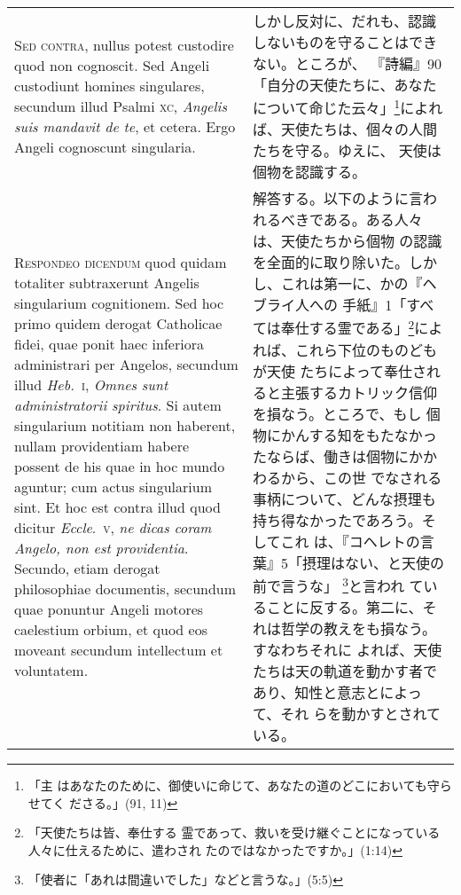 \documentclass[10pt]{jsarticle} %
\begin{document}
\begin{longtable}{p{21em}p{21em}}
\\


{\scshape Sed contra}, nullus potest custodire quod non cognoscit. Sed
Angeli custodiunt homines singulares, secundum illud Psalmi {\scshape
xc}, {\itshape Angelis suis mandavit de te}, et cetera. Ergo Angeli
cognoscunt singularia.


&


しかし反対に、だれも、認識しないものを守ることはできない。ところが、
『詩編』90「自分の天使たちに、あなたについて命じた云々」\footnote{「主
はあなたのために、御使いに命じて、あなたの道のどこにおいても守らせてく
ださる。」(91, 11)}によれば、天使たちは、個々の人間たちを守る。ゆえに、
天使は個物を認識する。

\\


{\scshape Respondeo dicendum} quod quidam totaliter subtraxerunt
Angelis singularium cognitionem. Sed hoc primo quidem derogat
Catholicae fidei, quae ponit haec inferiora administrari per Angelos,
secundum illud {\itshape Heb.}~{\scshape i}, {\itshape Omnes sunt
administratorii spiritus}. Si autem singularium notitiam non haberent,
nullam providentiam habere possent de his quae in hoc mundo aguntur;
cum actus singularium sint. Et hoc est contra illud quod dicitur
{\itshape Eccle}.~{\scshape v}, {\itshape ne dicas coram Angelo, non
est providentia}. Secundo, etiam derogat philosophiae documentis,
secundum quae ponuntur Angeli motores caelestium orbium, et quod eos
moveant secundum intellectum et voluntatem.


&

解答する。以下のように言われるべきである。ある人々は、天使たちから個物
の認識を全面的に取り除いた。しかし、これは第一に、かの『ヘブライ人への
手紙』1「すべては奉仕する霊である」\footnote{「天使たちは皆、奉仕する
霊であって、救いを受け継ぐことになっている人々に仕えるために、遣わされ
たのではなかったですか。」(1:14)}によれば、これら下位のものどもが天使
たちによって奉仕されると主張するカトリック信仰を損なう。ところで、もし
個物にかんする知をもたなかったならば、働きは個物にかかわるから、この世
でなされる事柄について、どんな摂理も持ち得なかったであろう。そしてこれ
は、『コヘレトの言葉』5「摂理はない、と天使の前で言うな」
\footnote{「使者に「あれは間違いでした」などと言うな。」(5:5)}と言われ
ていることに反する。第二に、それは哲学の教えをも損なう。すなわちそれに
よれば、天使たちは天の軌道を動かす者であり、知性と意志とによって、それ
らを動かすとされている。

\\


\end{longtable}
\end{document}

